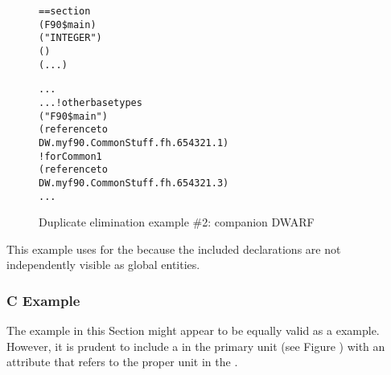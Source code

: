 \begin{figure}
\begin{dwflisting}
\begin{alltt}
== section 
        (F90\$main)
            ("INTEGER")
            ()
            (...)

            ...
        ...  ! other base types
            ("F90\$main")
                (reference to
                    DW.myf90.CommonStuff.fh.654321.1)
             ! for Common1
                (reference to
                    DW.myf90.CommonStuff.fh.654321.3)
            ...
\end{alltt}
\end{dwflisting}
\caption{Duplicate elimination example \#2: companion DWARF }
\label{fig:duplicateeliminationexample2companiondwarf}
\end{figure}

This example uses  for the 
because the included declarations are not independently
visible as global entities.


\subsubsection{C Example}

The  example 
in this Section might appear to be equally
valid as a  example. However, it is prudent to include
a 
in the primary unit 
(see Figure )
with an  attribute that refers to the proper unit
in the .

